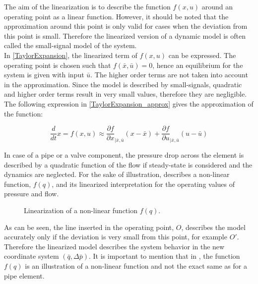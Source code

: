 The aim of the linearization is to describe the function $f(x,u)$ around an operating point as a linear function. However, it should be noted that the approximation around this point is only valid for cases when the deviation from this point is small. Therefore the linearized version of a dynamic model is often called the small-signal model of the system. 
\\
In \eqref{TaylorExpansion}, the linearized term of $f(x,u)$ can be expressed. The operating point is chosen such that $f(\bar{x},\bar{u}) = 0$,  hence an equilibrium for the system is given with input $\bar{u}$. The higher order terms are not taken into account in the approximation. Since the model is described by small-signals, quadratic and higher order terms result in very small values, therefore they are negligible. 
\\
The following expression in \eqref{TaylorExpansion_approx} gives the approximation of the function: 

\begin{equation}
\frac{d}{dt} x = f(x,u) \approx \frac{\partial f}{\partial x}_{|\bar{x}, \bar{u}} (x-\bar{x}) + \frac{\partial f}{\partial u}_{|\bar{x}, \bar{u}} (u-\bar{u}) 
 \label{TaylorExpansion_approx}
\end{equation}

In case of a pipe or a valve component, the pressure drop across the element is described by a quadratic function of the flow if steady-state is considered and the dynamics are neglected. For the sake of illustration,  describes a non-linear function, $f(q)$, and its linearized interpretation for the operating values of pressure and flow. 

\begin{figure}[H]
\centering
 
\caption{Linearization of a non-linear function $f(q).$}
\label{fig:linearization}
\end{figure}

As can be seen, the line inserted in the operating point, $O$, describes the model accurately only if the deviation is very small from this point, for example $O'$. Therefore the linearized model describes the system behavior in the new coordinate system $(\bar{q},\Delta \bar{p})$. It is important to mention that in , the function $f(q)$ is an illustration of a non-linear function and not the exact same as for a pipe element. 

